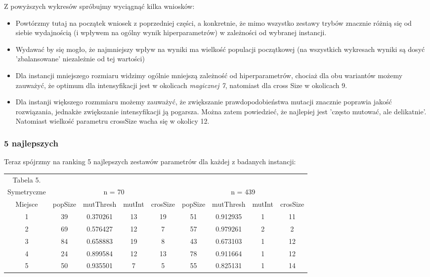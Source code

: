 \documentclass{article}
\begin{document}
Z powyższych wykresów spróbujmy wyciągnąć kilka wniosków:
\begin{itemize}
	\item Powtórzmy tutaj na początek wniosek z poprzedniej części, a konkretnie, że mimo wszystko zestawy trybów znacznie różnią się od siebie wydajnością (i wpływem na ogólny wynik hiperparametrów) w zależności od wybranej instancji.
	\item Wydawać by się mogło, że najmniejszy wpływ na wyniki ma wielkość populacji początkowej (na wszystkich wykresach wyniki są dosyć 'zbalansowane' niezależnie od tej wartości)
	\item Dla instancji mniejszego rozmiaru widzimy ogólnie mniejszą zależność od hiperparametrów, chociaż dla obu wariantów możemy zauważyć, że optimum dla intensyfikacji jest w okolicach \textit{magicznej 7}, natomiast dla cross Size w okolicach 9.
	\item Dla instanji większego rozmmiaru możemy zauważyć, że zwiększanie prawdopodobieństwa mutacji znacznie poprawia jakość rozwiązania, jednakże zwiększanie intensyfikacji ją pogarsza. Można zatem powiedzieć, że najlepiej jest 'często mutować, ale delikatnie'. Natomiast wielkość parametru crossSize wacha się w okolicy 12.
\end{itemize}

\subsubsection{5 najlepszych}
Teraz spójrzmy na ranking 5 najlepszych zestawów parametrów dla każdej z badanych instancji:

\begin{table}[h!]
	\centering
	\begin{tabular}{c||c|c|c|c||c|c|c|c}
Tabela 5.\\
Symetryczne & \multicolumn{4}{c}{n = 70} &\multicolumn{4}{c}{n = 439}\\
Miejsce & popSize & mutThresh & mutInt & crosSize & popSize & mutThresh & mutInt & crosSize \\
\hline
1 & 39 & 0.370261 & 13 & 19 & 51 & 0.912935 & 1 & 11 \\
2 & 69 & 0.576427 & 12 & 7 & 57 & 0.979261 & 2 & 2 \\
3 & 84 & 0.658883 & 19 & 8 & 43 & 0.673103 & 1 & 12 \\
4 & 24 & 0.899584 & 12 & 13 & 78 & 0.911664 & 1 & 12 \\
5 & 50 & 0.935501 & 7 & 5 & 55 & 0.825131 & 1 & 14 \\

	\end{tabular}
\end{table}
\end{document}
